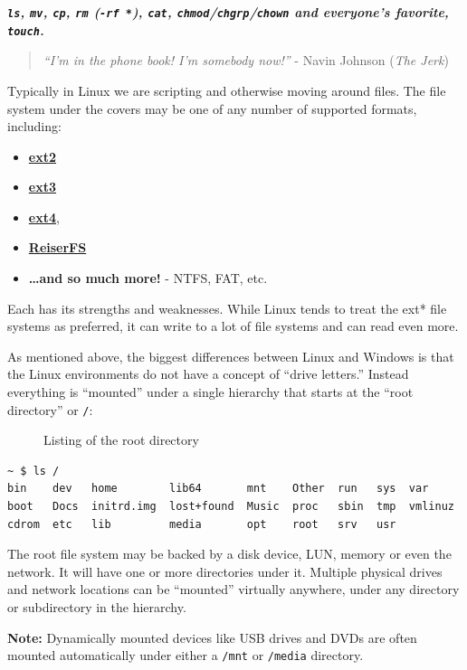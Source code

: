 \documentclass[10pt,]{book}
\numberwithin{figure}{chapter}
\DeclareRobustCommand{\drcap}[1]{\begin{figure}[H]\caption{#1}\end{figure}}
\begin{document}
\textbf{\emph{\texttt{ls}, \texttt{mv}, \texttt{cp}, \texttt{rm}
(\texttt{-rf *}), \texttt{cat},
\texttt{chmod}/\texttt{chgrp}/\texttt{chown} and everyone's favorite,
\texttt{touch}.}}

\begin{quote}
\emph{``I'm in the phone book! I'm somebody now!''} - Navin Johnson
(\emph{The Jerk})
\end{quote}

Typically in Linux we are scripting and otherwise moving around files.
The file system under the covers may be one of any number of supported
formats, including:

\begin{itemize}
\item
  \href{https://en.wikipedia.org/wiki/Ext2}{\textbf{ext2}}
\item
  \href{https://en.wikipedia.org/wiki/Ext3}{\textbf{ext3}}
\item
  \href{https://en.wikipedia.org/wiki/Ext4}{\textbf{ext4}},
\item
  \href{https://en.wikipedia.org/wiki/ReiserFS}{\textbf{ReiserFS}}
\item
  \textbf{\ldots{}and so much more!} - NTFS, FAT, etc.
\end{itemize}

Each has its strengths and weaknesses. While Linux tends to treat the
ext* file systems as preferred, it can write to a lot of file systems
and can read even more.

As mentioned above, the biggest differences between Linux and Windows is
that the Linux environments do not have a concept of ``drive letters.''
Instead everything is ``mounted'' under a single hierarchy that starts
at the ``root directory'' or \texttt{/}:

\drcap{Listing of the root directory}

\begin{verbatim}
~ $ ls /
bin    dev   home        lib64       mnt    Other  run   sys  var
boot   Docs  initrd.img  lost+found  Music  proc   sbin  tmp  vmlinuz
cdrom  etc   lib         media       opt    root   srv   usr
\end{verbatim}

The root file system may be backed by a disk device, LUN, memory or even
the network. It will have one or more directories under it. Multiple
physical drives and network locations can be ``mounted'' virtually
anywhere, under any directory or subdirectory in the hierarchy.

\textbf{Note:} Dynamically mounted devices like USB drives and DVDs are
often mounted automatically under either a \texttt{/mnt} or
\texttt{/media} directory.
\end{document}
